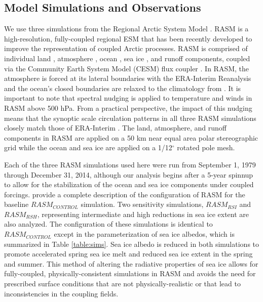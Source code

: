 \documentclass[draft,linenumbers]{agujournal}
\begin{document}
\subsection{Model Simulations and Observations}
We use three simulations from the Regional Arctic System Model \citep[RASM;][]{Hamman_2016a,Roberts_2015a}.
RASM is a high-resolution, fully-coupled regional ESM that has been recently developed to improve the representation of coupled Arctic processes.
RASM is comprised of individual land \citep[see][]{Hamman_2016a}, atmosphere \citep[see][]{Cassano_2016}, ocean \citep[see][]{Roberts_2015a}, sea ice \citep[see][]{Roberts_2015a}, and runoff \citep[see][]{Hamman_2016b} components, coupled via the Community Earth System Model (CESM) flux coupler \citep{Craig_2012}.
In RASM, the atmosphere is forced at its lateral boundaries with the ERA-Interim Reanalysis \citep{Dee_2011} and the ocean's closed boundaries are relaxed to the climatology from \citet{Steele_2001}.
It is important to note that spectral nudging is applied to temperature and winds in RASM above 500 hPa.
From a practical perspective, the impact of this nudging means that the synoptic scale circulation patterns in all three RASM simulations closely match those of ERA-Interim \citep{Glisan_2013}.
The land, atmosphere, and runoff components in RASM are applied on a 50 km near equal area polar stereographic grid while the ocean and sea ice are applied on a 1/12$^{\circ}$ rotated pole mesh.

Each of the three RASM simulations used here were run from September 1, 1979 through December 31, 2014, although our analysis begins after a 5-year spinnup to allow for the stabilization of the ocean and sea ice components under coupled forcings.
\citet{Hamman_2016b} provide a complete description of the configuration of RASM for the baseline $RASM_{CONTROL}$ simulation.
Two sensitivity simulations, $RASM_{RSI}$ and $RASM_{RSH}$, representing intermediate and high reductions in sea ice extent are also analyzed.
The configuration of these simulations is identical to $RASM_{CONTROL}$ except in the parameterization of sea ice albedos, which is summarized in Table \ref{table:sims}.
Sea ice albedo is reduced in both simulations to promote accelerated spring sea ice melt and reduced sea ice extent in the spring and summer.
This method of altering the radiative properties of sea ice allows for fully-coupled, physically-consistent simulations in RASM and avoids the need for prescribed surface conditions that are not physically-realistic or that lead to inconsistencies in the coupling fields.
\end{document}
